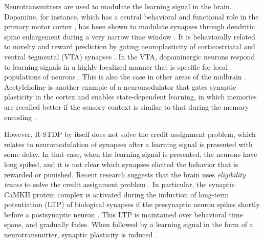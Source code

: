 Neurotransmitters are used to modulate the learning signal in the brain.
Dopamine, for instance, which has a central behavioral and functional role in the primary motor cortex \citep{barnes2005activity,dang2006disrupted}, has been shown to modulate synapses through dendritic spine enlargement during a very narrow time window \citep{dang2006disrupted}.
It is behaviorally related to novelty and reward prediction \citep{li2003dopamine,schultz2007behavioral} by gating neuroplasticity of corticostriatal \citep{reynolds2001cellular,reynolds2002dopamine} and ventral tegmental (VTA) synapses \citep{bao2001cortical}.
In the VTA, dopaminergic neurons respond to learning signals in a highly localized manner that is specific for local populations of neurons \citep{engelhard2019specialized}.
This is also the case in other areas of the midbrain \citep{roeper2013dissecting}.
Acetylcholine is another example of a neuromodulator that gates synaptic plasticity in the cortex and enables state-dependent learning, in which memories are recalled better if the sensory context is similar to that during the memory encoding \citep{shulz2000neuronal}.

However, R-STDP by itself does not solve the credit assignment problem, which relates to neuromodulation of synapses after a learning signal is presented with some delay.
In that case, when the learning signal is presented, the neurons have long spiked, and it is not clear which synapses elicited the behavior that is rewarded or punished.
Recent research suggests that the brain uses \emph{eligibility traces} \citep{izhikevich2007solving,florian2007reinforcement} to solve the credit assignment problem \citep{stolyarova2018solving,gerstner2018eligibility}.
In particular, the synaptic CaMKII protein complex is activated during the induction of long-term potentiation (LTP) of biological synapses if the presynaptic neuron spikes shortly before a postsynaptic neuron \citep{sanhueza2013camkii}.
This LTP is maintained over behavioral time spans, and gradually fades.
When followed by a learning signal in the form of a neurotransmitter, synaptic plasticity is induced \citep{yagishita2014critical,cassenaer2012conditional,gerstner2018eligibility}.

